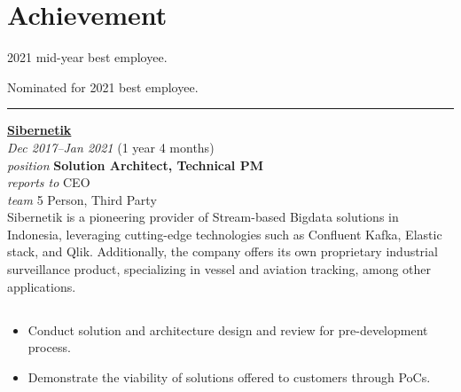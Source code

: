 \documentclass[12pt]{res}
\begin{document}
\begin{resume}
\begin{minipage}[t]{0.42\linewidth}
	\section{Achievement}
	\begin{flushleft}
        \begin{itemize}
		\footnotesize{\item 2021 mid-year best employee.

\item Nominated for 2021 best employee.}
        \end{itemize}
	\end{flushleft}
\end{minipage}

\vspace{10pt}
\rule{1.0\textwidth}{0.1pt}

\begin{multicols}{2}
	{\large {\bf \href{https://sibernetik.co.id}{Sibernetik}}} \\
	{\footnotesize{\sl Dec 2017--Jan 2021} \hfill (1 year 4 months)}\\
	{\footnotesize{\sl position} \hfill \bf{Solution Architect, Technical PM}}\\
	{\footnotesize{\sl reports to} \hfill CEO}\\
	{\footnotesize{\sl team} \hfill 5 Person, Third Party}\\

	\columnbreak
	{\footnotesize{Sibernetik is a pioneering provider of Stream-based Bigdata solutions in Indonesia, leveraging cutting-edge technologies such as Confluent Kafka, Elastic stack, and Qlik. Additionally, the company offers its own proprietary industrial surveillance product, specializing in vessel and aviation tracking, among other applications.}}\\
\end{multicols}
\vspace{-20pt}

\begin{multicols}{2}
	\section{}
		\begin{itemize}
			\item Conduct solution and architecture design and review for pre-development process.

\item Demonstrate the viability of solutions offered to customers through PoCs.


\end{itemize}
\end{multicols}
\end{resume}
\end{document}

